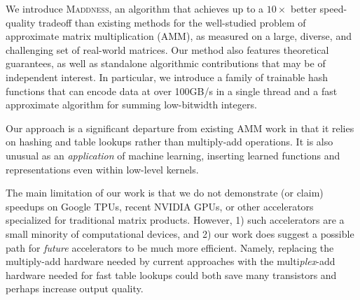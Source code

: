 \documentclass{article}  %
\newcommand{\ours}{\textsc{Maddness}}
\begin{document}

We introduce \ours, an algorithm that achieves up to a $10\times$ better speed-quality tradeoff than existing methods for the well-studied problem of approximate matrix multiplication (AMM), as measured on a large, diverse, and challenging set of real-world matrices.
Our method also features theoretical guarantees, as well as standalone algorithmic contributions that may be of independent interest. In particular, we introduce a family of trainable hash functions that can encode data at over 100GB/s in a single thread and a fast approximate algorithm for summing low-bitwidth integers.

Our approach is a significant departure from existing AMM work in that it relies on hashing and table lookups rather than multiply-add operations. It is also unusual as an \textit{application} of machine learning, inserting learned functions and representations even within low-level kernels.



The main limitation of our work is that we do not demonstrate (or claim) speedups on Google TPUs, recent NVIDIA GPUs, or other accelerators specialized for traditional matrix products. However, 1) such accelerators are a small minority of computational devices, and 2) our work does suggest a possible path for \textit{future} accelerators to be much more efficient. Namely, replacing the multiply-add hardware needed by current approaches with the multi\textit{plex}-add hardware needed for fast table lookups could both save many transistors and perhaps increase output quality.
\end{document}
